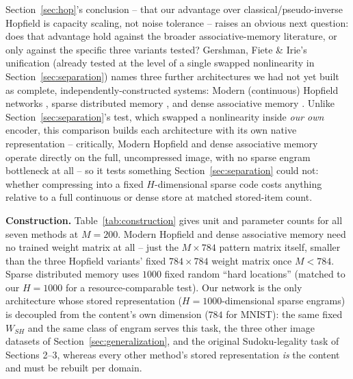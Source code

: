 \documentclass[11pt]{article}
\begin{document}
Section~\ref{sec:hop}'s conclusion -- that our advantage over classical/pseudo-inverse Hopfield
is capacity scaling, not noise tolerance -- raises an obvious next question: does that
advantage hold against the broader associative-memory literature, or only against the specific
three variants tested? Gershman, Fiete \& Irie's unification (already tested at the level of a
single swapped nonlinearity in Section~\ref{sec:separation}) names three further architectures
we had not yet built as complete, independently-constructed systems: Modern (continuous)
Hopfield networks \cite{ramsauer2020}, sparse distributed memory \cite{kanerva1988}, and dense
associative memory \cite{krotov2016}. Unlike Section~\ref{sec:separation}'s test, which swapped
a nonlinearity inside \emph{our own} encoder, this comparison builds each architecture with its
own native representation -- critically, Modern Hopfield and dense associative memory operate
directly on the full, uncompressed image, with no sparse engram bottleneck at all -- so it
tests something Section~\ref{sec:separation} could not: whether compressing into a fixed
$H$-dimensional sparse code costs anything relative to a full continuous or dense store at
matched stored-item count.

\textbf{Construction.} Table~\ref{tab:construction} gives unit and parameter counts for all
seven methods at $M{=}200$. Modern Hopfield and dense associative memory need no trained weight
matrix at all -- just the $M\times784$ pattern matrix itself, smaller than the three Hopfield
variants' fixed $784\times784$ weight matrix once $M<784$. Sparse distributed memory uses
$1000$ fixed random ``hard locations'' (matched to our $H{=}1000$ for a resource-comparable
test). Our network is the only architecture whose stored representation ($H{=}1000$-dimensional
sparse engrams) is decoupled from the content's own dimension ($784$ for MNIST): the same fixed
$W_{SH}$ and the same class of engram serves this task, the three other image datasets of
Section~\ref{sec:generalization}, and the original Sudoku-legality task of Sections 2--3,
whereas every other method's stored representation \emph{is} the content and must be rebuilt
per domain.
\end{document}
